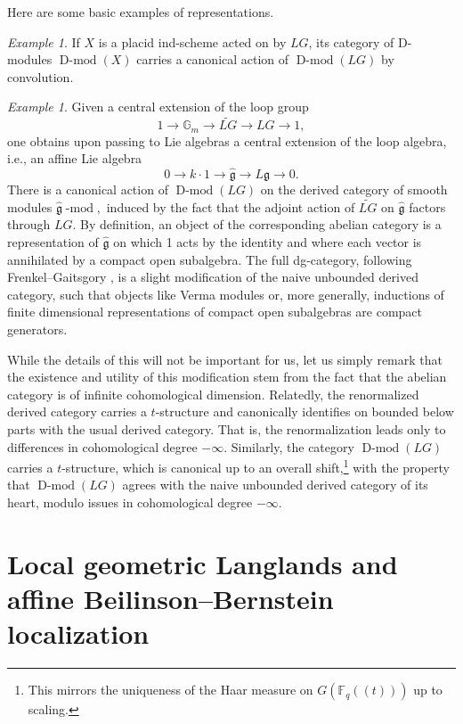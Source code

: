 \documentclass[10pt]{amsart}
\newcommand{\Fqt}{\Fq(\!(t)\!)}
\newcommand{\fg}{\mathfrak{g}}
\newcommand{\on}{\operatorname}
\renewcommand{\mod}{\on{-mod}}
\newcommand{\Dmod}{\on{D-mod}}
\newcommand{\Fq}{\mathbb{F}_q}
\theoremstyle{remark}
\newtheorem{ex}[subsubsection]{Example}
\newcommand{\gk}{\widehat{\fg}}
\numberwithin{equation}{section}
\renewcommand{\mod}{\operatorname{-mod}}
\begin{document}
	Here are some basic examples of representations. 
	
	\begin{ex} If $X$ is a placid ind-scheme acted on by $LG$, its category of 
	D-modules $\Dmod(X)$ carries a canonical action of $\Dmod(LG)$ by 
	convolution. 		
	\end{ex}
	
	
	\begin{ex}\label{ex:kmmods} Given a central extension of the loop group
		\[
		1 \rightarrow \mathbb{G}_m \rightarrow \widetilde{LG} \rightarrow LG 
		\rightarrow 1,
		\]
		one obtains upon passing to Lie algebras a central extension of the loop algebra, i.e., an affine Lie 
		algebra
		\[
		 0 \rightarrow k \cdot 1 \rightarrow \gk \rightarrow L \fg \rightarrow 
		 0. 
		\]
		There is a canonical action of $\Dmod(LG)$ on the derived category of 
		smooth modules
		$
		    \gk\mod,
		$
		induced by the fact that the adjoint action of $\widetilde{LG}$ on $\widehat{\fg}$ factors through $LG$. By definition, an object of the corresponding abelian category is a 
		representation of $\gk$ on which 1 acts by the identity and where each vector 
		is annihilated by a compact open subalgebra. The full dg-category, 
		following Frenkel--Gaitsgory \cite{fglocaff}, is a slight 
		modification of the naive unbounded derived category, such that objects 
		like Verma modules or, more generally, inductions of finite dimensional 
		representations of compact open subalgebras are compact generators. 
		
		
		While 
		the details of this will not be important for us, let us simply remark 
		that the existence and utility of this modification stem from the fact that the abelian category 
		is of infinite cohomological dimension. Relatedly, the renormalized derived 
		category carries a $t$-structure and canonically identifies on bounded 
		below parts with 
		the usual derived category. That is, the renormalization leads only to 
		differences in  
		cohomological degree 
		$-\infty$. Similarly, the category 
		$\Dmod(LG)$ carries a $t$-structure, which is canonical up to an overall 
		shift,\footnote{This mirrors the uniqueness of the Haar measure on 
		$G(\Fqt)$ up to scaling.} with the property that $\Dmod(LG)$ agrees with the naive unbounded 
		derived 
		category of its heart, modulo issues in cohomological degree 
		$-\infty$.   
	\end{ex}
	
	
	
	
		\section{Local geometric Langlands and affine Beilinson--Bernstein localization}
	
\end{document}

